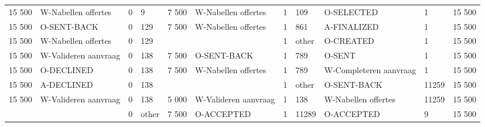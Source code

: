 \begin{tabular}{llllllllllr}
15 500 & W-Nabellen offertes & 0 & 9 & 7 500 & W-Nabellen offertes & 1 & 109 & O-SELECTED & 1 & 15 500 \\
15 500 & O-SENT-BACK & 0 & 129 & 7 500 & W-Nabellen offertes & 1 & 861 & A-FINALIZED & 1 & 15 500 \\
15 500 & W-Nabellen offertes & 0 & 129 &  &  & 1 & other & O-CREATED & 1 & 15 500 \\
15 500 & W-Valideren aanvraag & 0 & 138 & 7 500 & O-SENT-BACK & 1 & 789 & O-SENT & 1 & 15 500 \\
15 500 & O-DECLINED & 0 & 138 & 7 500 & W-Nabellen offertes & 1 & 789 & W-Completeren aanvraag & 1 & 15 500 \\
15 500 & A-DECLINED & 0 & 138 &  &  & 1 & other & O-SENT-BACK & 11259 & 15 500 \\
15 500 & W-Valideren aanvraag & 0 & 138 & 5 000 & W-Valideren aanvraag & 1 & 138 & W-Nabellen offertes & 11259 & 15 500 \\
 &  & 0 & other & 7 500 & O-ACCEPTED & 1 & 11289 & O-ACCEPTED & 9 & 15 500 \\
\bottomrule
\end{tabular}
